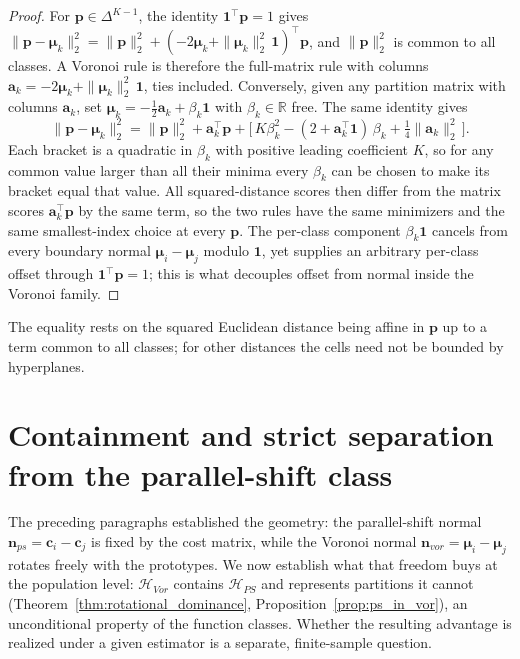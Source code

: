 \begin{proof}
    For $\mathbf{p} \in \Delta^{K-1}$, the identity $\mathbf{1}^\top \mathbf{p} = 1$ gives $\|\mathbf{p} - \boldsymbol{\mu}_k\|_2^2 = \|\mathbf{p}\|_2^2 + (-2\boldsymbol{\mu}_k + \|\boldsymbol{\mu}_k\|_2^2\,\mathbf{1})^\top \mathbf{p}$, and $\|\mathbf{p}\|_2^2$ is common to all classes. A Voronoi rule is therefore the full-matrix rule with columns $\mathbf{a}_k = -2\boldsymbol{\mu}_k + \|\boldsymbol{\mu}_k\|_2^2\,\mathbf{1}$, ties included. Conversely, given any partition matrix with columns $\mathbf{a}_k$, set $\boldsymbol{\mu}_k = -\tfrac{1}{2}\mathbf{a}_k + \beta_k \mathbf{1}$ with $\beta_k \in \mathbb{R}$ free. The same identity gives
    \begin{equation*}
        \|\mathbf{p} - \boldsymbol{\mu}_k\|_2^2 = \|\mathbf{p}\|_2^2 + \mathbf{a}_k^\top \mathbf{p} + \big[\, K\beta_k^2 - (2 + \mathbf{a}_k^\top \mathbf{1})\,\beta_k + \tfrac{1}{4}\|\mathbf{a}_k\|_2^2 \,\big].
    \end{equation*}
    Each bracket is a quadratic in $\beta_k$ with positive leading coefficient $K$, so for any common value larger than all their minima every $\beta_k$ can be chosen to make its bracket equal that value. All squared-distance scores then differ from the matrix scores $\mathbf{a}_k^\top \mathbf{p}$ by the same term, so the two rules have the same minimizers and the same smallest-index choice at every $\mathbf{p}$. The per-class component $\beta_k \mathbf{1}$ cancels from every boundary normal $\boldsymbol{\mu}_i - \boldsymbol{\mu}_j$ modulo $\mathbf{1}$, yet supplies an arbitrary per-class offset through $\mathbf{1}^\top \mathbf{p} = 1$; this is what decouples offset from normal inside the Voronoi family.
\end{proof}

The equality rests on the squared Euclidean distance being affine in $\mathbf{p}$ up to a term common to all classes; for other distances the cells need not be bounded by hyperplanes.

\section{Containment and strict separation from the parallel-shift class}

The preceding paragraphs established the geometry: the parallel-shift normal $\mathbf{n}_{ps} = \mathbf{c}_i - \mathbf{c}_j$ is fixed by the cost matrix, while the Voronoi normal $\mathbf{n}_{vor} = \boldsymbol{\mu}_i - \boldsymbol{\mu}_j$ rotates freely with the prototypes. We now establish what that freedom buys at the population level: $\mathcal{H}_{Vor}$ contains $\mathcal{H}_{PS}$ and represents partitions it cannot (Theorem~\ref{thm:rotational_dominance}, Proposition~\ref{prop:ps_in_vor}), an unconditional property of the function classes. Whether the resulting advantage is realized under a given estimator is a separate, finite-sample question.


